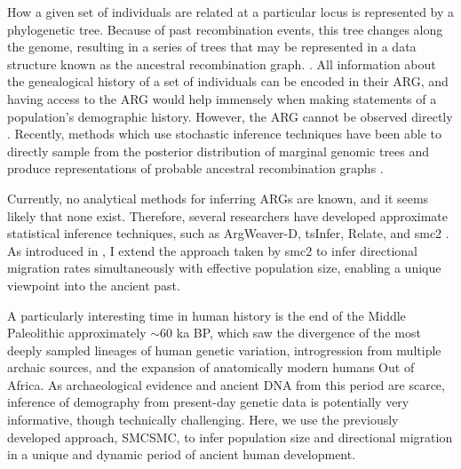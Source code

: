 How a given set of individuals are related at a particular locus is represented by a phylogenetic tree.  Because of past recombination events, this tree changes along the genome, resulting in a series of trees that may be represented in a data structure known as the ancestral recombination graph. \cite{Rasmussen2014}. 
All information about the genealogical history of a set of individuals can be encoded in their ARG, and having access to the ARG would help immensely when making statements of a population’s demographic history.  However, the ARG cannot be observed directly \cite{Speidel2019}. 
Recently, methods which use stochastic inference techniques have been able to directly sample from the posterior distribution of marginal genomic trees and produce representations of probable ancestral recombination graphs \cite{Speidel2019, Kelleher2019, Rasmussen2014}.

Currently, no analytical methods for inferring ARGs are known, and it seems likely that none exist.  
Therefore, several researchers have developed approximate statistical inference techniques, such as ArgWeaver-D, tsInfer, Relate, and \gls{smc2} \cite{Speidel2019,Kelleher2019,Rasmussen2014,10.1371/journal.pone.0247647}.
As introduced in , I extend the approach taken by \gls{smc2} to infer directional migration rates simultaneously with effective population size, enabling a unique viewpoint into the ancient past.


A particularly interesting time in human history is the end of the Middle Paleolithic approximately $\sim$60 ka BP, which saw the divergence of the most deeply sampled lineages of human genetic variation, introgression from multiple archaic sources, and the expansion of anatomically modern humans Out of Africa. 
As archaeological evidence and ancient DNA from this period are scarce, inference of demography from present-day genetic data is potentially very informative, though technically challenging. Here, we use the previously developed approach, SMCSMC, to infer population size and directional migration in a unique and dynamic period of ancient human development.

